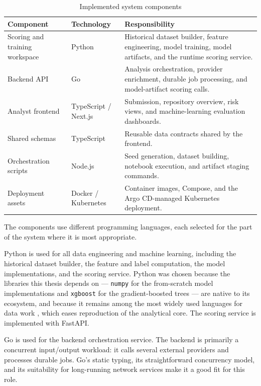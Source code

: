 \begin{table}[htbp]
\centering
\caption{Implemented system components}
\label{tab:impl-components}
\begin{tabular}{p{} p{} p{}}
\hline
\textbf{Component} & \textbf{Technology} & \textbf{Responsibility} \\
\hline
Scoring and training workspace & Python & Historical dataset builder, feature engineering, model training, model artifacts, and the runtime scoring service. \\
Backend API & Go & Analysis orchestration, provider enrichment, durable job processing, and model-artifact scoring calls. \\
Analyst frontend & TypeScript / Next.js & Submission, repository overview, risk views, and machine-learning evaluation dashboards. \\
Shared schemas & TypeScript & Reusable data contracts shared by the frontend. \\
Orchestration scripts & Node.js & Seed generation, dataset building, notebook execution, and artifact staging commands. \\
Deployment assets & Docker / Kubernetes & Container images, Compose, and the Argo CD-managed Kubernetes deployment. \\
\hline
\end{tabular}
\end{table}

\label{sec:impl-technology}
The components use different programming languages, each selected for the part of the system where it is most appropriate.

Python is used for all data engineering and machine learning, including the historical dataset builder, the feature and label computation, the model implementations, and the scoring service. Python was chosen because the libraries this thesis depends on --- \texttt{numpy} for the from-scratch model implementations and \texttt{xgboost} for the gradient-boosted trees --- are native to its ecosystem, and because it remains among the most widely used languages for data work \cite{stackoverflow_python_2025}, which eases reproduction of the analytical core. The scoring service is implemented with FastAPI.

Go is used for the backend orchestration service. The backend is primarily a concurrent input/output workload: it calls several external providers and processes durable jobs. Go's static typing, its straightforward concurrency model, and its suitability for long-running network services make it a good fit for this role.

